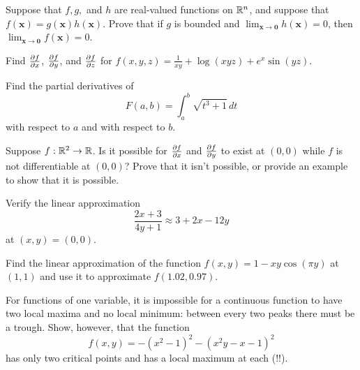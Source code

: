 \documentclass[svgnames]{watsonbook}
\begin{document}
\begin{aexercise}
  Suppose that $f,g,$ and $h$ are real-valued functions on $\mathbb{R}^n$, and
  suppose that $f(\mathbf{x}) = g(\mathbf{x})h(\mathbf{x})$. Prove that if $g$
  is bounded and $\lim_{\mathbf{x}\to \mathbf{0}}h(\mathbf{x}) = 0$, then
  $\lim_{\mathbf{x}\to \mathbf{0}}f(\mathbf{x}) = 0$.
\end{aexercise}


\begin{aexercise}
  Find $\frac{\partial f}{\partial x}$, $\frac{\partial f}{\partial y}$, and $\frac{\partial f}{\partial z}$ for
  $f(x,y,z) = \frac{1}{xy} + \log(xyz) + e^x\sin(y z) $.
\end{aexercise}

\begin{aexercise}
  Find the partial derivatives of
  \[
    F(a,b) = \int_a^b \sqrt{t^3+1}\,dt
  \]
  with respect to $a$ and with respect to $b$.
\end{aexercise}


\begin{aexercise}
  Suppose $f:\mathbb{R}^2 \to \mathbb{R}$. Is it possible for $\frac{\partial f}{\partial x}$ and
  $\frac{\partial f}{\partial y}$ to exist at $(0,0)$ while $f$ is not differentiable at
  $(0,0)$?  Prove that it isn't possible, or provide an example to
  show that it is possible.
\end{aexercise}


\begin{aexercise}
  Verify the linear approximation
  \[
    \frac{2x+3}{4y+1} \approx 3 + 2x - 12y
  \]
  at $(x,y) = (0,0)$.
\end{aexercise}

\begin{aexercise}
  Find the linear approximation of the function
  $f(x,y) = 1-xy\cos(\pi y)$ at $(1,1)$ and use it to approximate
  $f(1.02,0.97)$.
\end{aexercise}




\begin{aexercise}
  For functions of one variable, it is impossible for a continuous
  function to have two local maxima and no local minimum: between
  every two peaks there must be a trough. Show, however, that the
  function
  \[
    f(x,y) = -(x^2-1)^2-(x^2y-x-1)^2
  \]
  has only two critical points and has a local maximum at each (!!). 
\end{aexercise}
\end{document}
